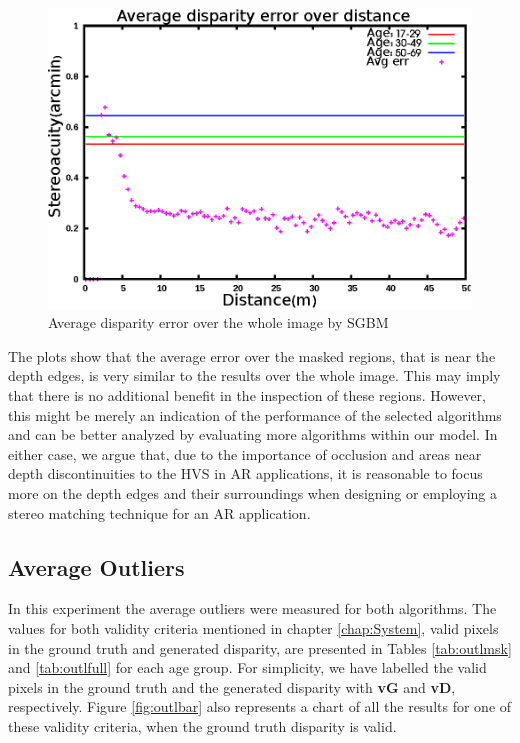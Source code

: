 \begin{figure}[H]
\centering
\includegraphics[scale=0.8]{sgbmfull3}
\caption{Average disparity error over the whole image by SGBM}
\label{fig:sgbmfull3}
\end{figure} 

The plots show that the average error over the masked regions, that is near the depth edges, is very similar to the results over the whole image. 
This may imply that there is no additional benefit in the inspection of these regions. 
However, this might be merely an indication of the performance of the selected algorithms and can be better analyzed by evaluating more algorithms 
within our model.
In either case, we argue that, due to the importance of occlusion and areas near depth discontinuities to the HVS in AR applications, 
it is reasonable to focus more on the depth edges and their surroundings when designing or employing a stereo matching technique for an AR application.

\subsection{Average Outliers}
In this experiment the average outliers were measured for both algorithms. 
The values for both validity criteria mentioned in chapter \ref{chap:System}, valid pixels in the ground truth and generated disparity, 
are presented in Tables \ref{tab:outlmsk} and \ref{tab:outlfull} for each age group. For simplicity, we have labelled the valid pixels
in the ground truth and the generated disparity with \textbf{vG} and \textbf{vD}, respectively.
Figure \ref{fig:outlbar} also represents a chart of all the results for one of these validity criteria, when the ground truth disparity is valid.

